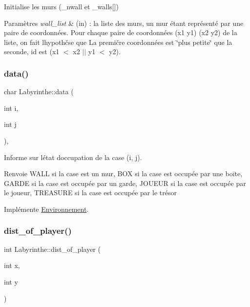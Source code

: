 Initialise les murs (\+\_\+nwall et \+\_\+walls\mbox{[}\mbox{]}) 


\begin{DoxyParams}{Paramètres}
{\em wall\+\_\+list} & (in) \+: la liste des murs, un mur étant représenté par une paire de coordonnées. Pour chaque paire de coordonnées (x1 y1) (x2 y2) de la liste, on fait l\textquotesingle{}hypothčse que La premičre coordonnées est \char`\"{}plus petite\char`\"{} que la seconde, id est (x1 $<$ x2 $\vert$$\vert$ y1 $<$ y2). \\
\hline
\end{DoxyParams}
\mbox{\label{classLabyrinthe_a433936ae60ddf3f0b85a407f414b8d38}} 
\subsubsection{\texorpdfstring{data()}{data()}}
{\footnotesize\ttfamily char Labyrinthe\+::data (\begin{DoxyParamCaption}\item[{int}]{i,  }\item[{int}]{j }\end{DoxyParamCaption})\hspace{0.3cm}{\ttfamily [inline]}, {\ttfamily [virtual]}}



Informe sur l\textquotesingle{}état d\textquotesingle{}occupation de la case (i, j). 

\begin{DoxyReturn}{Renvoie}
W\+A\+LL si la case est un mur, B\+OX si la case est occupée par une boīte, G\+A\+R\+DE si la case est occupée par un garde, J\+O\+U\+E\+UR si la case est occupée par le joueur, T\+R\+E\+A\+S\+U\+RE si la case est occupée par le trésor 
\end{DoxyReturn}


Implémente \hyperlink{classEnvironnement_a0fae4716da729dbf13f52f09f2d293cd}{Environnement}.

\mbox{\label{classLabyrinthe_a66e8fffb2a5acb505b860174f66a3456}} 
\subsubsection{\texorpdfstring{dist\+\_\+of\+\_\+player()}{dist\_of\_player()}}
{\footnotesize\ttfamily int Labyrinthe\+::dist\+\_\+of\+\_\+player (\begin{DoxyParamCaption}\item[{int}]{x,  }\item[{int}]{y }\end{DoxyParamCaption})\hspace{0.3cm}{\ttfamily [inline]}}



